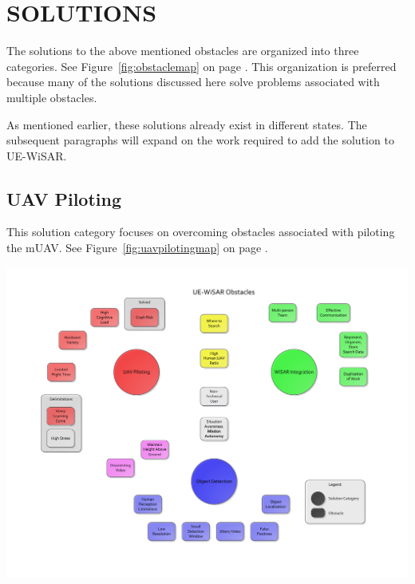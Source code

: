 \documentclass[12pt]{IEEEtran}
\begin{document}
\section{SOLUTIONS}
The solutions to the above mentioned obstacles are organized into three categories.
See Figure~\ref{fig:obstaclemap} on page
\pageref{fig:obstaclemap}.  This organization is preferred because many of
the solutions discussed here solve problems associated with multiple obstacles. 

As mentioned earlier, these solutions already exist in different states.  The
subsequent paragraphs will expand on the work required to add the solution to
UE-WiSAR.

\subsection{UAV Piloting}
This solution category focuses on overcoming obstacles
associated with piloting the mUAV.  See Figure~\ref{fig:uavpilotingmap} on page
\pageref{fig:uavpilotingmap}.

\begin{mapping*}[htp]
	\vspace{-80pt}
	\hspace{-95pt}
	\includegraphics[keepaspectratio=true, width=\paperheight, height=\paperheight,
	 page=3, angle=90]{obstacle_solution_map.pdf}
	 \label{fig:uavpilotingmap}
\end{mapping*}
\end{document}
